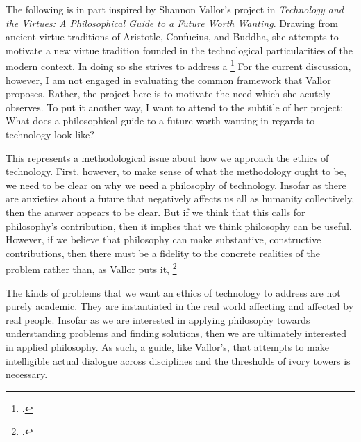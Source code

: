 \documentclass[letterpaper,notitlepage,12pt]{article}
\begin{document}

The following is in part inspired by Shannon Vallor's project in
  \textit{Technology and the Virtues: A Philosophical Guide to a Future Worth
  Wanting}.
Drawing from ancient virtue traditions of Aristotle, Confucius, and Buddha, she
  attempts to motivate a new virtue tradition founded in the technological
  particularities of the modern context.
In doing so she strives to address a \footcite[p. 9]{vallor_technology_2018}
For the current discussion, however,  I am not engaged in evaluating the common
  framework that Vallor proposes.
Rather, the project here is to motivate the need which she acutely observes.
To put it another way, I want to attend to the subtitle of her project: What
does a philosophical guide to a future worth wanting in regards to technology
look like?

This represents a methodological issue about how we approach the ethics of
technology.
First, however, to make sense of what the methodology ought to be, we need to
be clear on why we need a philosophy of technology.
Insofar as there are anxieties about a future that negatively affects us all as
humanity collectively, then the answer appears to be clear.
But if we think that this calls for philosophy's contribution, then it implies
that we think philosophy can be useful.
However, if we believe that philosophy can make substantive, constructive
contributions, then there must be a fidelity to the concrete realities of the
problem rather than, as Vallor puts it, \footcite[p. 33]{vallor_technology_2018}

The kinds of problems that we want an ethics of technology to address are not
purely academic.
They are instantiated in the real world affecting and affected by real people.
Insofar as we are interested in applying philosophy towards understanding
problems and finding solutions, then we are ultimately interested in applied
philosophy.
As such, a guide, like Vallor's, that attempts to make intelligible actual
dialogue across disciplines and the thresholds of ivory towers is necessary.
\end{document}

